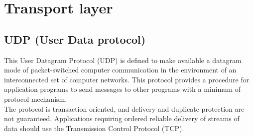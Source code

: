 \chapter{Transport layer}
\section{UDP (User Data protocol)}
This User Datagram  Protocol  (UDP)  is  defined  to  make  available  a
datagram   mode  of  packet-switched   computer   communication  in  the
environment  of  an  interconnected  set  of  computer  networks\cite{RFC768}. This protocol  provides  a procedure  for application  programs  to send
messages  to other programs  with a minimum  of protocol mechanism.\\
The protocol  is transaction oriented, and delivery and duplicate protection
are not guaranteed.  Applications requiring ordered reliable delivery of
streams of data should use the Transmission Control Protocol (TCP).
